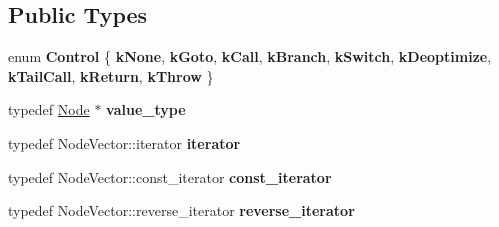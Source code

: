 \subsection*{Public Types}
\begin{DoxyCompactItemize}
\item 
\mbox{\label{classv8_1_1internal_1_1compiler_1_1BasicBlock_a7162100f0572bd1e40481cb882497a9d}} 
enum {\bfseries Control} \{ \newline
{\bfseries k\+None}, 
{\bfseries k\+Goto}, 
{\bfseries k\+Call}, 
{\bfseries k\+Branch}, 
\newline
{\bfseries k\+Switch}, 
{\bfseries k\+Deoptimize}, 
{\bfseries k\+Tail\+Call}, 
{\bfseries k\+Return}, 
\newline
{\bfseries k\+Throw}
 \}
\item 
\mbox{\label{classv8_1_1internal_1_1compiler_1_1BasicBlock_a9d3bef41c553b850f67ebd791f055fff}} 
typedef \mbox{\hyperlink{classv8_1_1internal_1_1compiler_1_1Node}{Node}} $\ast$ {\bfseries value\+\_\+type}
\item 
\mbox{\label{classv8_1_1internal_1_1compiler_1_1BasicBlock_aaba0521b1798202fdb1b361e70a5b5cc}} 
typedef Node\+Vector\+::iterator {\bfseries iterator}
\item 
\mbox{\label{classv8_1_1internal_1_1compiler_1_1BasicBlock_ac048ade40b17747143dfbd16859366ef}} 
typedef Node\+Vector\+::const\+\_\+iterator {\bfseries const\+\_\+iterator}
\item 
\mbox{\label{classv8_1_1internal_1_1compiler_1_1BasicBlock_a50b6e483eb6d4c9ccba10a2d354b7c4b}} 
typedef Node\+Vector\+::reverse\+\_\+iterator {\bfseries reverse\+\_\+iterator}
\end{DoxyCompactItemize}
